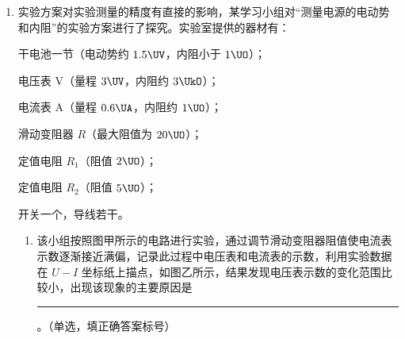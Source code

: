 \documentclass[\gkver]{gaokaozhenti}
\begin{document}
\begin{enumerate}
\begin{enumerate}
\item
根据上述数据，进一步分析得到当地的重力加速度大小为\rule{1.8cm}{0.4pt}$\Umsq$（结果保留 2 位有效数字，$\sin37^\circ=0.60$，$\cos37^\circ=0.80$）。
\end{enumerate}



\item
实验方案对实验测量的精度有直接的影响，某学习小组对“测量电源的电动势和内阻”的实验方案进行了探究。实验室提供的器材有：

干电池一节（电动势约 $1.5\UV$，内阻小于 $1\UO$）；

电压表 V（量程 $3\UV$，内阻约 $3\UkO$）；

电流表 A（量程 $0.6\UA$，内阻约 $1\UO$）；

滑动变阻器 $R$（最大阻值为 $20\UO$）；

定值电阻 $R_{1}$（阻值 $2\UO$）；

定值电阻 $R_{2}$（阻值 $5\UO$）；

开关一个，导线若干。
\begin{enumerate}
\item
该小组按照图甲所示的电路进行实验，通过调节滑动变阻器阻值使电流表示数逐渐接近满偏，记录此过程中电压表和电流表的示数，利用实验数据在 $U-I$ 坐标纸上描点，如图乙所示，结果发现电压表示数的变化范围比较小，出现该现象的主要原因是\rule{1.5cm}{0.4pt}。（单选，填正确答案标号）


\end{enumerate}
\end{enumerate}
\end{document}
